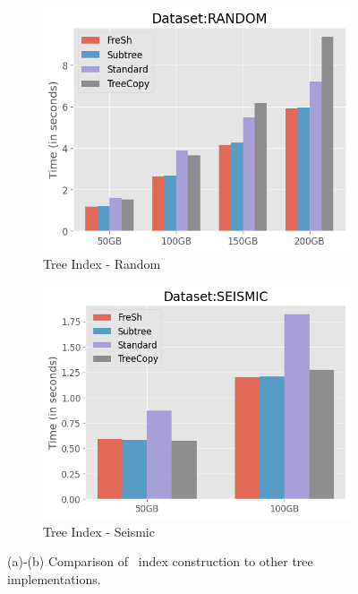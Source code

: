 \begin{figure}[htbp]
    \begin{subfigure}{0.48\textwidth}
        \includegraphics[width=\textwidth]{figures/Experiments/scale-dataset-tree-index-random.png}
        \caption{Tree Index - Random}
        \label{fig:eval:scale-dataset:tree-index:random}
    \end{subfigure}    
    \begin{subfigure}{0.48\textwidth}
        \includegraphics[width=\textwidth]{figures/Experiments/scale-dataset-tree-index-seismic.png}
        \caption{Tree Index - Seismic}
        \label{fig:eval:scale-dataset:tree-index:seismic}
    \end{subfigure}    

    \caption{(a)-(b) Comparison of \Fresh\ index construction to other tree implementations.}
    \label{fig:eval:scale-dataset:tree-index}
\end{figure}


